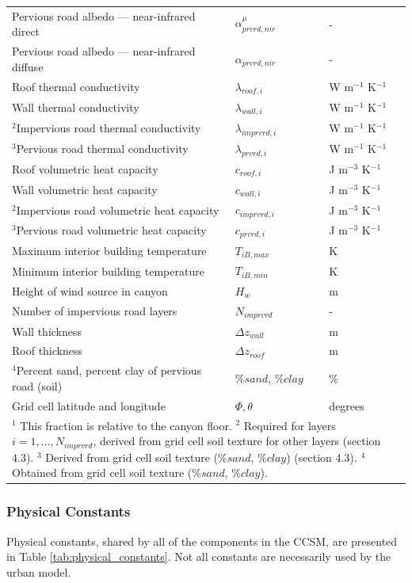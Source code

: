 \documentclass[12pt,authoryear]{elsarticle}
\numberwithin{equation}{section} %
\begin{document}
\begin{longtable}{p{10cm} p{3cm} p{3cm}}
Pervious road albedo --- near-infrared direct & $\alpha_{prvrd,nir}^{\mu}$ & - \\
Pervious road albedo --- near-infrared diffuse & $\alpha_{prvrd,nir}$ & - \\
Roof thermal conductivity & $\lambda_{roof,i}$ & W m$^{-1}$ K$^{-1}$ \\
Wall thermal conductivity & $\lambda_{wall,i}$ & W m$^{-1}$ K$^{-1}$ \\
\endfirsthead
\endhead
$^{2}$Impervious road thermal conductivity & $\lambda_{imprvrd,i}$ & W m$^{-1}$ K$^{-1}$ \\
$^{3}$Pervious road thermal conductivity & $\lambda_{prvrd,i}$ & W m$^{-1}$ K$^{-1}$ \\
Roof volumetric heat capacity & $c_{roof,i}$ & J m$^{-3}$ K$^{-1}$ \\
Wall volumetric heat capacity & $c_{wall,i}$ & J m$^{-3}$ K$^{-1}$ \\
$^{2}$Impervious road volumetric heat capacity & $c_{imprvrd,i}$ & J m$^{-3}$ K$^{-1}$ \\
$^{3}$Pervious road volumetric heat capacity & $c_{prvrd,i}$ & J m$^{-3}$ K$^{-1}$ \\
Maximum interior building temperature & $T_{iB,max}$ & K \\
Minimum interior building temperature & $T_{iB,min}$ & K \\
Height of wind source in canyon & $H_{w}$ & m \\
Number of impervious road layers & $N_{imprvrd}$ & - \\
Wall thickness & $\Delta z_{wall}$ & m \\
Roof thickness & $\Delta z_{roof}$ & m \\
$^{4}$Percent sand, percent clay of pervious road (soil) & \%$sand$, \%$clay$ & \% \\
Grid cell latitude and longitude & $\Phi, \theta$ & degrees \\
\bottomrule
\multicolumn{3}{p{\textwidth}}{\footnotesize
$^{1}$ This fraction is relative to the canyon floor. 
$^{2}$ Required for layers $i=1,...,N_{imprvrd}$, derived from grid cell soil texture for other layers (section 4.3). 
$^{3}$ Derived from grid cell soil texture ($\%sand$, $\%clay$) (section 4.3). 
$^{4}$ Obtained from grid cell soil texture ($\%sand$, $\%clay$).}
\end{longtable}

\subsubsection{Physical Constants}
%
Physical constants, shared by all of the components in the CCSM, are presented in
Table \ref{tab:physical_constants}. Not all constants are necessarily used by the urban model.
\end{document}
